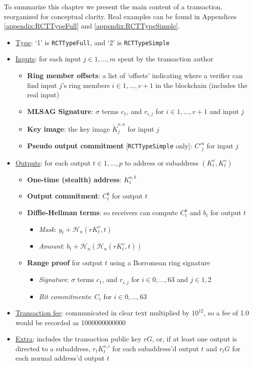 To summarize this chapter we present the main content of a transaction, reorganized for conceptual clarity. Real examples can be found in Appendices \ref{appendix:RCTTypeFull} and \ref{appendix:RCTTypeSimple}.

\begin{itemize}
    \item \underline{Type}: `1' is {\tt RCTTypeFull}, and `2' is {\tt RCTTypeSimple}
    \item \underline{Inputs}: for each input $j \in 1,...,m$ spent by the transaction author
    \begin{itemize}
        \item \textbf{Ring member offsets}: a list of `offsets' indicating where a verifier can find input $j$'s ring members $i \in 1,...,v+1$ in the blockchain (includes the real input)
        \item \textbf{MLSAG Signature}: $\sigma$ terms $c_1$, and $r_{i,j}$ for $i \in 1,...,v+1$ and input $j$
        \item \textbf{Key image}: the key image $\tilde{K}^{o,a}_j$ for input $j$
        \item \textbf{Pseudo output commitment} {[{\tt RCTTypeSimple} only]}: $C'^{a}_j$ for input $j$
    \end{itemize}
    
    \item \underline{Outputs}: for each output $t \in 1,...,p$ to address or subaddress $(K^v_t,K^s_t)$
    \begin{itemize}
        \item \textbf{One-time (stealth) address}: $K^{o,b}_t$
        \item \textbf{Output commitment}: $C^{b}_t$ for output $t$
        \item \textbf{Diffie-Hellman terms}: so receivers can compute $C^{b}_t$ and $b_t$ for output $t$
        \begin{itemize}
            \item \textit{Mask}: $y_t + \mathcal{H}_n(r K^v_t,t)$
            \item \textit{Amount}: $b_t + \mathcal{H}_n(\mathcal{H}_n(r K^v_t,t))$
        \end{itemize}
        \item \textbf{Range proof} for output $t$ using a Borromean ring signature
        \begin{itemize}
            \item \textit{Signature}: $\sigma$ terms $c_1$, and $r_{i,j}$ for $i \in 0,...,63$ and $j \in 1,2$
            \item \textit{Bit commitments}: $C_i$ for $i \in 0,...,63$
        \end{itemize}
    \end{itemize}
    \item \underline{Transaction fee}: communicated in clear text multiplied by $10^{12}$, so a fee of 1.0 would be recorded as 1000000000000
    \item \underline{Extra}: includes the transaction public key $r G$, or, if at least one output is directed to a subaddress, $r_t K^{s,i}_t$ for each subaddress'd output $t$ and $r_t G$ for each normal address'd output $t$
\end{itemize}